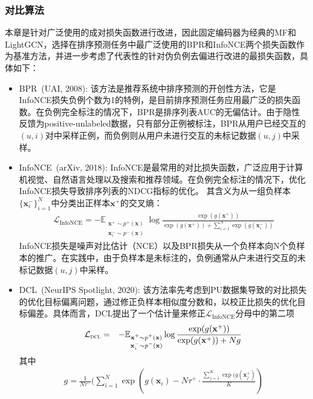 \subsubsection{对比算法}
本章是针对广泛使用的成对损失函数进行改进，因此固定编码器为经典的MF和LightGCN，选择在排序预测任务中最广泛使用的BPR和InfoNCE两个损失函数作为基准方法，并进一步考虑了代表性的针对伪负例去偏进行改进的最损失函数，具体如下：
\begin{itemize}
	\item BPR~\cite{Steffen:2009:UAI}(UAI, 2008): 该方法是推荐系统中排序预测的开创性方法，它是InfoNCE损失负例个数为1的特例，是目前排序预测任务应用最广泛的损失函数。在负例完全标注的情况下，BPR是排序列表AUC的无偏估计。由于隐性反馈为positive-unlabeled数据，只有部分正例被标注，BPR从用户已经交互的$(u,i)$对中采样正例，而负例则从用户未进行交互的未标记数据$(u,j)$中采样。
	\item InfoNCE~\cite{Oord:2018:arxiv}(arXiv, 2018): InfoNCE是最常用的对比损失函数，广泛应用于计算机视觉、自然语言处理以及搜索和推荐领域。在负例完全标注的情况下，优化InfoNCE损失导致排序列表的NDCG指标的优化\cite{Jiancan:2022:arxiv}。
	其含义为从一组负样本$\{\mathbf{x}_i^-\}_{i=1}^N$中分类出正样本$\mathbf{x}^+$的交叉熵：
	\begin{eqnarray}\label{eq:Info}
		\mathcal{L}_\text{InfoNCE} =  - \mathbb{E}_{\substack{\mathbf x^+ \sim p^+(\mathbf x) \\ \mathbf x_i^- \sim p^-(\mathbf x)}} \log\frac{\exp(g(\mathbf{x}^+))}{\exp(g(\mathbf{x}^+))+ \sum_{i=1}^{N}\exp( g(\mathbf{x}_i^-))} \nonumber
	\end{eqnarray}
	InfoNCE损失是噪声对比估计（NCE）以及BPR损失从一个负样本向N个负样本的推广。在实践中，由于负样本是未标注的，负例通常从户未进行交互的未标记数据$(u,j)$中采样。
	\item DCL~\cite{Chuang:2020:NIPS}(NeurIPS Spotlight, 2020): 该方法率先考虑到PU数据集导致的对比损失的优化目标偏离问题，通过修正负样本相似度分数和，以校正比损失的优化目标偏差。具体而言，DCL提出了一个估计量来修正$\mathcal{L}_\text{InfoNCE}$分母中的第二项 
	\begin{eqnarray}\label{eq:DCL}
		\mathcal{L}_\textsc{dcl} 
		&=&  - \mathbb{E}_{\substack{\mathbf x^+ \sim p^+(\mathbf x) \\ \mathbf x_i^- \sim p^-(\mathbf x)}}\log\frac{\exp(g(\mathbf{x}^+))}{\exp(g(\mathbf{x}^+))+ Ng} \nonumber
	\end{eqnarray}
	其中
	\begin{eqnarray}\nonumber
		g =  \frac{1}{N\tau^-}  (\sum_{i=1}^{N} \exp(g(\mathbf{x}_i) - N\tau^+ \cdot \frac{\sum_{j=1}^{K} \exp(g(\mathbf{x}^+_j)}{K} ) \label{Eq:DCLEstimator}

\end{eqnarray}
\end{itemize}
